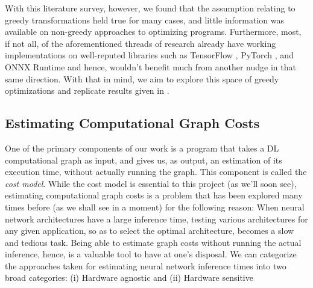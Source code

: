 \documentclass[12pt,a4paper,twoside,openright,bibliography=totocnumbered]{report}
\begin{document}
With this literature survey, however, we found that the assumption relating to greedy transformations held true for many cases, and little information was available on non-greedy approaches to optimizing programs. Furthermore, most, if not all, of the aforementioned threads of research already have working implementations on well-reputed libraries such as TensorFlow \cite{tf2016}, PyTorch \cite{pytorchdocs}, and ONNX Runtime \cite{onnxoptimizer} and hence, wouldn't benefit much from another nudge in that same direction. With that in mind, we aim to explore this space of greedy optimizations and replicate results given in \cite{jia2019}.

\subsection{Estimating Computational Graph Costs}
One of the primary components of our work is a program that takes a DL computational graph as input, and gives us, as output, an estimation of its execution time, without actually running the graph. This component is called the \textit{cost model}. While the cost model is essential to this project (as we'll soon see), estimating computational graph costs is a problem that has been explored many times before (as we shall see in a moment) for the following reason:
When neural network architectures have a large inference time, testing various architectures for any given application, so as to select the optimal architecture, becomes a slow and tedious task. Being able to estimate graph costs without running the actual inference, hence, is a valuable tool to have at one's disposal.
We can categorize the approaches taken for estimating neural network inference times into two broad categories: (i) Hardware agnostic and (ii) Hardware sensitive
\end{document}

